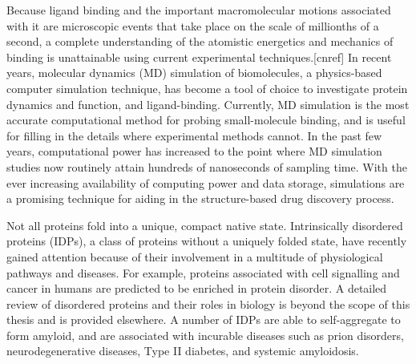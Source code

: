 Because ligand binding and the important macromolecular motions associated with it are microscopic events that take place on the scale of millionths of a second, a complete understanding of the atomistic energetics and mechanics of binding is unattainable using current experimental techniques.[cnref] In recent years, molecular dynamics (MD) simulation of biomolecules, a physics-based computer simulation technique, has become a tool of choice to investigate protein dynamics and function, and ligand-binding.\cite{Durrant:2011bm,Karplus:2002wt} Currently, MD simulation is the most accurate computational method for probing small-molecule binding, and is useful for filling in the details where experimental methods cannot.\cite{Durrant:2011bm} In the past few years, computational power has increased to the point where MD simulation studies now routinely attain hundreds of nanoseconds of sampling time.\cite{Freddolino:2008dj,Chakrabarti:2010gf,Li:2012bx,Neale:2013wq} With the ever increasing availability of computing power and data storage, simulations are a promising technique for aiding in the structure-based drug discovery process.\cite{Durrant:2011bm}

Not all proteins fold into a unique, compact native state. Intrinsically disordered proteins (IDPs), a class of proteins without a uniquely folded state, have recently gained attention because of their involvement in a multitude of physiological pathways and diseases.\cite{Sigalov:2010p7619} For example, proteins associated with cell signalling and cancer in humans are predicted to be enriched in protein disorder.\cite{Dunker:2002ex}
A detailed review of disordered proteins and their roles in biology is beyond the scope of this thesis and is provided elsewhere.\cite{Rauscher:2010p5682,Uversky:2008gh} A number of IDPs are able to self-aggregate to form amyloid, and are associated with incurable diseases such as prion disorders, neurodegenerative diseases, Type II diabetes, and systemic amyloidosis.\cite{Chiti:2006fz}

